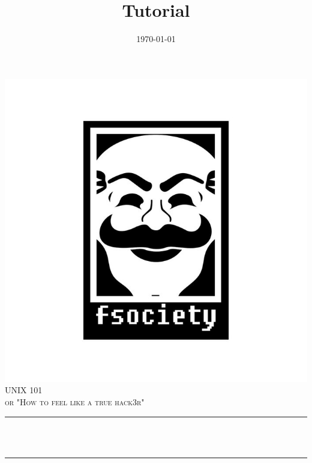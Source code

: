 \documentclass[12pt]{article}
\title{Tutorial}								%
\date{\today}											%
\makeatletter
\let\thetitle\@title
\let\thedate\@date
\makeatother
\begin{document}

\begin{titlepage}
	\centering
    \vspace*{0.5 cm}
    \includegraphics[scale = 0.3]{resources/logo4.png}\\[1.0 cm]
    \textsc{\LARGE \newline\newline UNIX 101}\\[2.0 cm]
	\textsc{\Large or "How to feel like a true hack3r"}\\[0.5 cm]
	\rule{\linewidth}{0.2 mm} \\[0.4 cm]
	{ \huge \bfseries \thetitle}\\
	\rule{\linewidth}{0.2 mm} \\[1.5 cm]
	
%           
%        
	
	
    \thedate
    
    
    
	
\end{titlepage}
\end{document}
